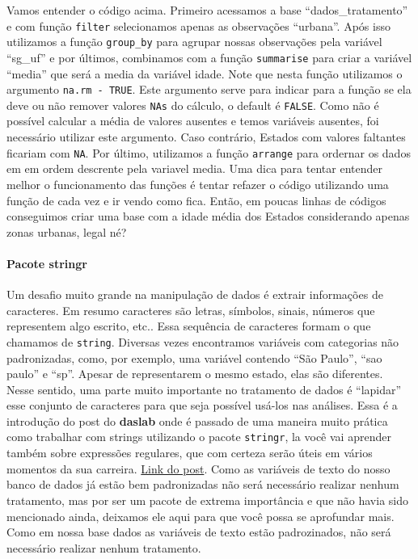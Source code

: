 \documentclass[
  letterpaper,
  DIV=11,
  numbers=noendperiod]{scrreprt}
\let\oldparagraph\paragraph
\renewcommand{\paragraph}[1]{\oldparagraph{#1}\mbox{}}
\begin{document}
Vamos entender o código acima. Primeiro acessamos a base
``dados\_tratamento'' e com função \texttt{filter} selecionamos apenas
as observações ``urbana''. Após isso utilizamos a função
\texttt{group\_by} para agrupar nossas observações pela variável
``sg\_uf'' e por últimos, combinamos com a função \texttt{summarise}
para criar a variável ``media'' que será a media da variável idade. Note
que nesta função utilizamos o argumento \texttt{na.rm\ -\ TRUE}. Este
argumento serve para indicar para a função se ela deve ou não remover
valores \texttt{NA\textquotesingle{}s} do cálculo, o default é
\texttt{FALSE}. Como não é possível calcular a média de valores ausentes
e temos variáveis ausentes, foi necessário utilizar este argumento. Caso
contrário, Estados com valores faltantes ficariam com \texttt{NA}. Por
último, utilizamos a função \texttt{arrange} para ordernar os dados em
em ordem descrente pela variavel media. Uma dica para tentar entender
melhor o funcionamento das funções é tentar refazer o código utilizando
uma função de cada vez e ir vendo como fica. Então, em poucas linhas de
códigos conseguimos criar uma base com a idade média dos Estados
considerando apenas zonas urbanas, legal né?

\hypertarget{pacote-stringr}{%
\paragraph{Pacote stringr}\label{pacote-stringr}}

Um desafio muito grande na manipulação de dados é extrair informações de
caracteres. Em resumo caracteres são letras, símbolos, sinais, números
que representem algo escrito, etc.. Essa sequência de caracteres formam
o que chamamos de \texttt{string}. Diversas vezes encontramos variáveis
com categorias não padronizadas, como, por exemplo, uma variável
contendo ``São Paulo'', ``sao paulo'' e ``sp''. Apesar de representarem
o mesmo estado, elas são diferentes. Nesse sentido, uma parte muito
importante no tratamento de dados é ``lapidar'' esse conjunto de
caracteres para que seja possível usá-los nas análises. Essa é a
introdução do post do \textbf{daslab} onde é passado de uma maneira
muito prática como trabalhar com strings utilizando o pacote
\texttt{stringr}, la você vai aprender também sobre expressões
regulares, que com certeza serão úteis em vários momentos da sua
carreira. \href{https://daslab-ufes.github.io/stringr/}{Link do post}.
Como as variáveis de texto do nosso banco de dados já estão bem
padronizadas não será necessário realizar nenhum tratamento, mas por ser
um pacote de extrema importância e que não havia sido mencionado ainda,
deixamos ele aqui para que você possa se aprofundar mais. Como em nossa
base dados as variáveis de texto estão padrozinados, não será necessário
realizar nenhum tratamento.
\end{document}
